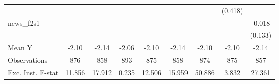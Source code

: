 {\begin{tabular}{l*{8}{c}}
            &                     &                     &                     &                     &                     &                     &     (0.418)         &                     \\
\addlinespace
news\_f2s1   &                     &                     &                     &                     &                     &                     &                     &      -0.018         \\
            &                     &                     &                     &                     &                     &                     &                     &     (0.133)         \\
\midrule
Mean Y      &       -2.10         &       -2.14         &       -2.06         &       -2.10         &       -2.14         &       -2.10         &       -2.10         &       -2.14         \\
Observations&         876         &         858         &         893         &         875         &         858         &         874         &         875         &         857         \\
Exc. Inst. F-stat&      11.856         &      17.912         &       0.235         &      12.506         &      15.959         &      50.886         &       3.832         &      27.361         \\
\bottomrule
\end{tabular}
}
